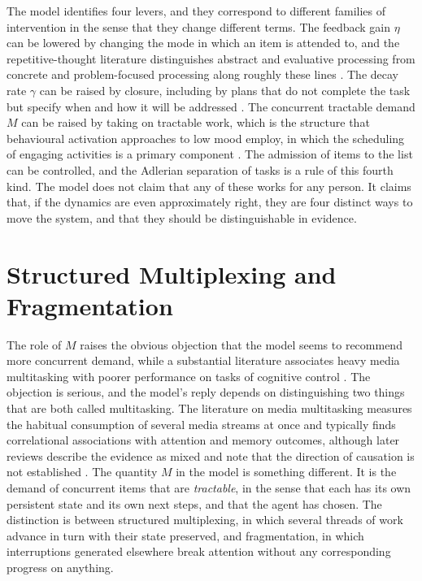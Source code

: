 \documentclass[11pt]{article}
\theoremstyle{definition}
\begin{document}
The model identifies four levers, and they correspond to different families of intervention in the sense that they change different terms. The feedback gain $\eta$ can be lowered by changing the mode in which an item is attended to, and the repetitive-thought literature distinguishes abstract and evaluative processing from concrete and problem-focused processing along roughly these lines \cite{watkins2008}. The decay rate $\gamma$ can be raised by closure, including by plans that do not complete the task but specify when and how it will be addressed \cite{masicampo2011}. The concurrent tractable demand $M$ can be raised by taking on tractable work, which is the structure that behavioural activation approaches to low mood employ, in which the scheduling of engaging activities is a primary component \cite{jacobson1996, dimidjian2006}. The admission of items to the list can be controlled, and the Adlerian separation of tasks is a rule of this fourth kind. The model does not claim that any of these works for any person. It claims that, if the dynamics are even approximately right, they are four distinct ways to move the system, and that they should be distinguishable in evidence.

\section{Structured Multiplexing and Fragmentation}
\label{sec:multiplexing}

The role of $M$ raises the obvious objection that the model seems to recommend more concurrent demand, while a substantial literature associates heavy media multitasking with poorer performance on tasks of cognitive control \cite{ophir2009}. The objection is serious, and the model's reply depends on distinguishing two things that are both called multitasking. The literature on media multitasking measures the habitual consumption of several media streams at once and typically finds correlational associations with attention and memory outcomes, although later reviews describe the evidence as mixed and note that the direction of causation is not established \cite{uncapher2018}. The quantity $M$ in the model is something different. It is the demand of concurrent items that are \emph{tractable}, in the sense that each has its own persistent state and its own next steps, and that the agent has chosen. The distinction is between structured multiplexing, in which several threads of work advance in turn with their state preserved, and fragmentation, in which interruptions generated elsewhere break attention without any corresponding progress on anything.
\end{document}
